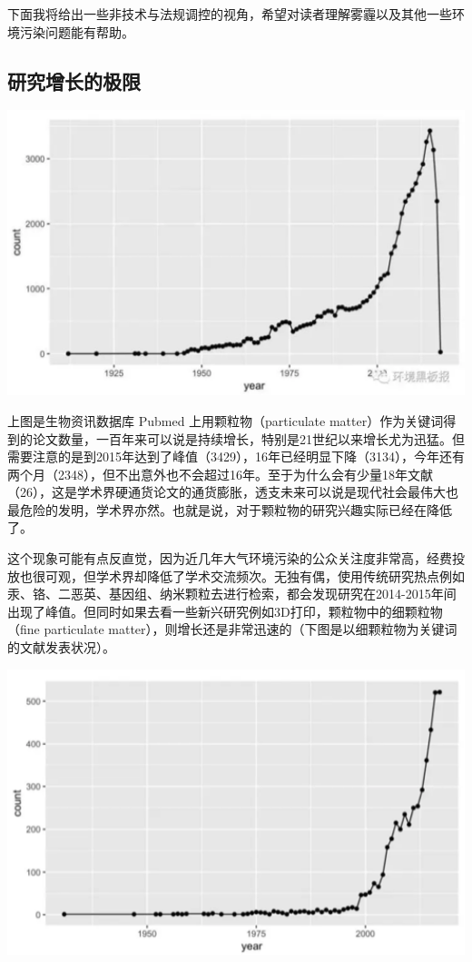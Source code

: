 \documentclass[]{book}
\begin{document}
下面我将给出一些非技术与法规调控的视角，希望对读者理解雾霾以及其他一些环境污染问题能有帮助。

\hypertarget{ux7814ux7a76ux589eux957fux7684ux6781ux9650}{%
\subsection{研究增长的极限}\label{ux7814ux7a76ux589eux957fux7684ux6781ux9650}}

\includegraphics[width=6.67in]{images/cw2}

上图是生物资讯数据库 Pubmed 上用颗粒物（particulate matter）作为关键词得到的论文数量，一百年来可以说是持续增长，特别是21世纪以来增长尤为迅猛。但需要注意的是到2015年达到了峰值（3429），16年已经明显下降（3134），今年还有两个月（2348），但不出意外也不会超过16年。至于为什么会有少量18年文献（26），这是学术界硬通货论文的通货膨胀，透支未来可以说是现代社会最伟大也最危险的发明，学术界亦然。也就是说，对于颗粒物的研究兴趣实际已经在降低了。

这个现象可能有点反直觉，因为近几年大气环境污染的公众关注度非常高，经费投放也很可观，但学术界却降低了学术交流频次。无独有偶，使用传统研究热点例如汞、铬、二恶英、基因组、纳米颗粒去进行检索，都会发现研究在2014-2015年间出现了峰值。但同时如果去看一些新兴研究例如3D打印，颗粒物中的细颗粒物（fine particulate matter），则增长还是非常迅速的（下图是以细颗粒物为关键词的文献发表状况）。

\includegraphics[width=6.67in]{images/cw3}
\end{document}
